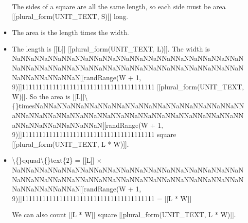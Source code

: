 \documentclass{article}
\begin{document}
\begin{itemize}
                    
                        The sides of a square are all the same length, so each
                        side must be area
                        [[plural\_form(UNIT\_TEXT, S)]] long.
  \item The area is the length times the width.
  \item The length is [[L]] [[plural\_form(UNIT\_TEXT, L)]].
                        The width is NaNNaNNaNNaNNaNNaNNaNNaNNaNNaNNaNNaNNaNNaNNaNNaNNaNNaNNaNNaNNaNNaNNaNNaNNaNNaNNaNNaNNaNNaNNaNNaNNaNNaNNaNNaNNaNNaNNaN[[randRange(W + 1, 9)]]111111111111111111111111111111111111111 [[plural\_form(UNIT\_TEXT, W)]].
                        So the area is [[L]]\textbackslash\{\}timesNaNNaNNaNNaNNaNNaNNaNNaNNaNNaNNaNNaNNaNNaNNaNNaNNaNNaNNaNNaNNaNNaNNaNNaNNaNNaNNaNNaNNaNNaNNaNNaNNaNNaNNaNNaNNaNNaNNaN[[randRange(W + 1, 9)]]111111111111111111111111111111111111111
                        square [[plural\_form(UNIT\_TEXT, L * W)]].
  \item \textbackslash\{\}qquad\textbackslash\{\}text\{2\} = [[L]] $\times$ NaNNaNNaNNaNNaNNaNNaNNaNNaNNaNNaNNaNNaNNaNNaNNaNNaNNaNNaNNaNNaNNaNNaNNaNNaNNaNNaNNaNNaNNaNNaNNaNNaNNaNNaNNaNNaNNaNNaN[[randRange(W + 1, 9)]]111111111111111111111111111111111111111
                        = [[L * W]]
                    
                    
                        We can also count [[L * W]]
                        square [[plural\_form(UNIT\_TEXT, L * W)]].
\end{itemize}
\end{document}
